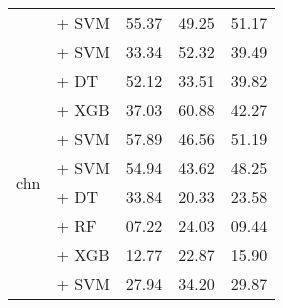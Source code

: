 \begin{table*}[ht]
\begin{tabular}{@{}llp{1.1cm}p{1.1cm}p{1.1cm}@{}}
                                           & \citep{wang2024multilingual} + SVM                                 & 55.37                           & 49.25                              & 51.17                             \\
                                           & \citep{nacar2025GATE} + SVM                                        & 33.34                           & 52.32                              & 39.49                             \\
        \midrule
        \multirow{12}{*}{chn}              & \citep{li2024conanembeddinggeneraltextembedding} + DT              & 52.12                           & 33.51                              & 39.82                             \\
                                           & \citep{li2024conanembeddinggeneraltextembedding} + XGB             & 37.03                           & 60.88                              & 42.27                             \\
                                           & \citep{li2024conanembeddinggeneraltextembedding} + SVM             & 57.89                           & 46.56                              & 51.19                             \\
                                           & \citep{wang2024multilingual} + SVM                                 & 54.94                           & 43.62                              & 48.25                             \\
                                           & \citep{zhang2024gme} + DT                                          & 33.84                           & 20.33                              & 23.58                             \\
                                           & \citep{zhang2024gme} + RF                                          & 07.22                           & 24.03                              & 09.44                             \\
                                           & \citep{zhang2024gme} + XGB                                         & 12.77                           & 22.87                              & 15.90                             \\
                                           & \citep{zhang2024gme} + SVM                                         & 27.94                           & 34.20                              & 29.87                             \\

\end{tabular}
\end{table*}
